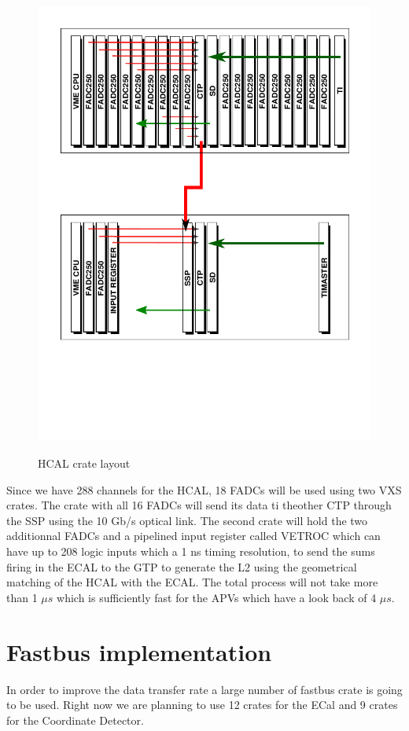 \documentclass{article}
\begin{document}
\begin{figure}
  \centering
  \includegraphics[width=\textwidth]{figs/VXSHCalFADC.pdf}\\
  \caption{HCAL crate layout }\label{fig:HCALFADC}
\end{figure}

Since we have 288 channels for the HCAL, 18 FADCs will be used using two VXS crates. The crate with all 16 FADCs will send its data ti theother CTP through the SSP using the 10 Gb/s optical link. The second crate will hold the two additionnal FADCs and a pipelined input register called VETROC which can have up to 208 logic inputs which a 1 ns timing resolution, to send the sums firing in the ECAL to the GTP to generate the L2 using the geometrical matching of the HCAL with the ECAL. The total process will not take more than 1 $\mu s$ which is sufficiently fast for the APVs which have a look back of 4 $\mu s$.

\section{Fastbus implementation}
In order to improve the data transfer rate a large number of fastbus crate is going to be used.
Right now we are planning to use 12 crates for the ECal and 9 crates for the Coordinate Detector.
\end{document}
